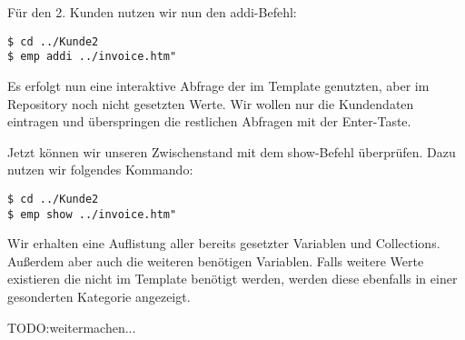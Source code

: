 Für den 2. Kunden nutzen wir nun den addi-Befehl:
\begin{lstlisting}[style=Bash]
$ cd ../Kunde2
$ emp addi ../invoice.htm"
\end{lstlisting}

Es erfolgt nun eine interaktive Abfrage der im Template genutzten, aber im Repository noch nicht gesetzten Werte. Wir wollen nur die Kundendaten eintragen und überspringen die restlichen Abfragen mit der Enter-Taste.

Jetzt können wir unseren Zwischenstand mit dem show-Befehl überprüfen. Dazu nutzen wir folgendes Kommando:
\begin{lstlisting}[style=Bash]
$ cd ../Kunde2
$ emp show ../invoice.htm"
\end{lstlisting}

Wir erhalten eine Auflistung aller bereits gesetzter Variablen und Collections. Außerdem aber auch die weiteren benötigen Variablen. Falls weitere Werte existieren die nicht im Template benötigt werden, werden diese ebenfalls in einer gesonderten Kategorie angezeigt.

TODO:weitermachen...



